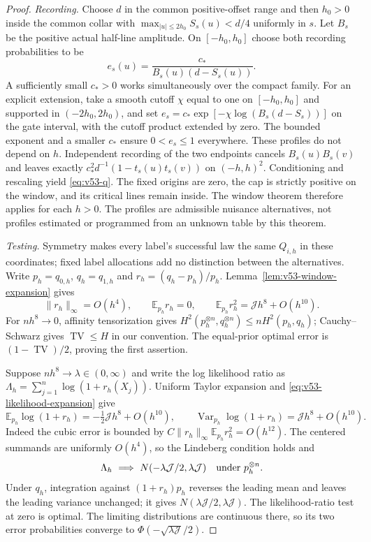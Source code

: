 \begin{proof}
\emph{Recording.}
Choose $d$ in the common positive-offset range and then $h_0>0$ inside
the common collar with $\max_{|u|\le2h_0}S_s(u)<d/4$ uniformly in $s$.
Let $B_s$ be the positive actual half-line amplitude.  On $[-h_0,h_0]$
choose both recording probabilities to be
\begin{equation}\label{eq:v53-efficiency}
              e_s(u)=\frac{c_*}{B_s(u)(d-S_s(u))}.
\end{equation}
A sufficiently small $c_*>0$ works simultaneously over the compact family.
For an explicit extension, take a smooth cutoff $\chi$ equal to one on
$[-h_0,h_0]$ and supported in $(-2h_0,2h_0)$, and set
$e_s=c_*\exp[-\chi\log(B_s(d-S_s))]$ on the gate interval, with the
cutoff product extended by zero.  The bounded exponent and a smaller
$c_*$ ensure $0<e_s\le1$ everywhere.  These profiles do not depend on $h$.
Independent recording of the two endpoints cancels $B_s(u)B_s(v)$ and
leaves exactly $c_*^2d^{-1}(1-t_s(u)t_s(v))$ on $(-h,h)^2$.
Conditioning and rescaling yield \eqref{eq:v53-q}.  The fixed origins
are zero, the cap is strictly positive on the window, and its critical
lines remain inside.  The window theorem therefore applies for each
$h>0$.  The profiles are admissible nuisance alternatives, not profiles
estimated or programmed from an unknown table by this theorem.

\emph{Testing.}
Symmetry makes every label's successful law the same $Q_{i,h}$ in these
coordinates; fixed label allocations add no distinction between the
alternatives.  Write $p_h=q_{0,h}$, $q_h=q_{1,h}$ and
$r_h=(q_h-p_h)/p_h$.  Lemma~\ref{lem:v53-window-expansion} gives
\begin{equation}\label{eq:v53-likelihood-expansion}
 \|r_h\|_\infty=O(h^4),\qquad
 \mathbb E_{p_h}r_h=0,\qquad
 \mathbb E_{p_h}r_h^2=\mathcal J h^8+O(h^{10}).
\end{equation}
For $nh^8\to0$, affinity tensorization gives
$H^2(p_h^{\otimes n},q_h^{\otimes n})\le nH^2(p_h,q_h)$;
Cauchy--Schwarz gives $\operatorname{TV}\le H$ in our convention.
The equal-prior optimal error is $(1-\operatorname{TV})/2$, proving the
first assertion.

Suppose $nh^8\to\lambda\in(0,\infty)$ and write the log likelihood ratio
as $\Lambda_h=\sum_{j=1}^n\log(1+r_h(X_j))$.  Uniform Taylor expansion
and \eqref{eq:v53-likelihood-expansion} give
\[
 \mathbb E_{p_h}\log(1+r_h)=-\tfrac12\mathcal J h^8+O(h^{10}),\qquad
 \operatorname{Var}_{p_h}\log(1+r_h)=\mathcal J h^8+O(h^{10}).
\]
Indeed the cubic error is bounded by
$C\|r_h\|_\infty\mathbb E_{p_h}r_h^2=O(h^{12})$.
The centered summands are uniformly $O(h^4)$, so the Lindeberg condition
holds and
\[
 \Lambda_h\ \Longrightarrow\ N(-\lambda\mathcal J/2,\lambda\mathcal J)
                         \quad\hbox{under }p_h^{\otimes n}.
\]
Under $q_h$, integration against $(1+r_h)p_h$ reverses the leading mean
and leaves the leading variance unchanged; it gives
$N(\lambda\mathcal J/2,\lambda\mathcal J)$.  The likelihood-ratio test
at zero is optimal.  The limiting distributions are continuous there,
so its two error probabilities converge to
$\Phi(-\sqrt{\lambda\mathcal J}/2)$.


\end{proof}
